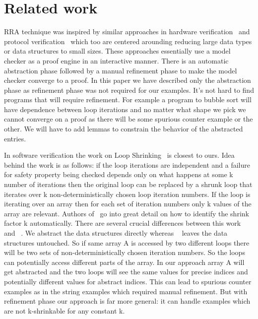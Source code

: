 \section{Related work}

RRA technique was inspired by similar approaches in hardware
verification~\cite{mcmillan} and protocol verification~\cite{self}
which too are centered arounding reducing large data types or data
structures to small sizes. These approaches essentially use a model
checker as a proof engine in an interactive manner. There is an
automatic abstraction phase followed by a manual refinement phase to
make the model checker converge to a proof. In this paper we have
described only the abstraction phase as refinement phase
was not required for our examples. It's not hard to find programs that
will require refinement. For example a program to bubble sort will
have dependence between loop iterations and no matter what shape we
pick we cannot converge on a proof as there will be some spurious
counter example or the other. We will have to add lemmas to constrain
the behavior of the abstracted entries.

In software verification the work on Loop Shrinking~\cite{loopshrink}
is closest to ours. Idea behind the work is as follows: if the loop
iterations are independent and a failure for safety property being
checked depends only on what happens at some k number of iterations
then the original loop can be replaced by a shrunk loop that iterates
over k non-deterministically chosen loop iteration numbers. If the
loop is iterating over an array then for each set of iteration numbers
only k values of the array are relevant. Authors of~\cite{loopshrink}
go into great detail on how to identify the shrink factor k
automatically. There are several crucial differences between this work
and ~\cite{loopshrink}. We abstract the data structures directly
whereas ~\cite{loopshrink} leaves the data structures untouched. So if
same array A is accessed by two different loops there will be two sets
of non-deterministically chosen iteration numbers. So the loops can
potentially access different parts of the array. In our approach array
A will get abstracted and the two loops will see the same values for
precise indices and potentially different values for abstract
indices. This can lead to spurious counter examples as in the string
examples which required manual refinement. But with refinement phase
our approach is far more general: it can handle examples which are not
k-shrinkable for any constant k.

